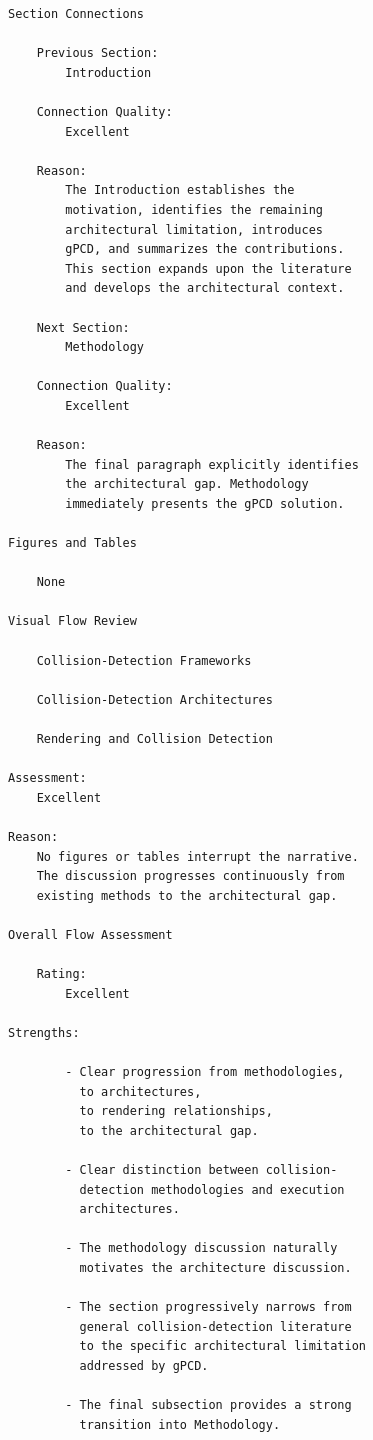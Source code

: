\begin{verbatim}
Section Connections

    Previous Section:
        Introduction

    Connection Quality:
        Excellent

    Reason:
        The Introduction establishes the
        motivation, identifies the remaining
        architectural limitation, introduces
        gPCD, and summarizes the contributions.
        This section expands upon the literature
        and develops the architectural context.

    Next Section:
        Methodology

    Connection Quality:
        Excellent

    Reason:
        The final paragraph explicitly identifies
        the architectural gap. Methodology
        immediately presents the gPCD solution.

Figures and Tables

    None

Visual Flow Review

    Collision-Detection Frameworks

    Collision-Detection Architectures

    Rendering and Collision Detection

Assessment:
    Excellent

Reason:
    No figures or tables interrupt the narrative.
    The discussion progresses continuously from
    existing methods to the architectural gap.

Overall Flow Assessment

    Rating:
        Excellent

Strengths:

        - Clear progression from methodologies,
          to architectures,
          to rendering relationships,
          to the architectural gap.

        - Clear distinction between collision-
          detection methodologies and execution
          architectures.

        - The methodology discussion naturally
          motivates the architecture discussion.

        - The section progressively narrows from
          general collision-detection literature
          to the specific architectural limitation
          addressed by gPCD.

        - The final subsection provides a strong
          transition into Methodology.


\end{verbatim}
